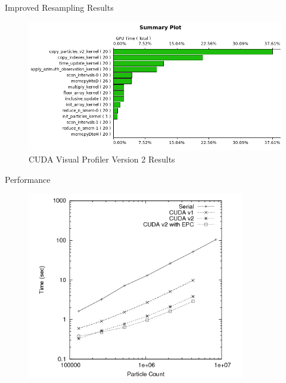 \documentclass{beamer}
\begin{document}

\begin{frame}{Improved Resampling Results}

\begin{figure}
\centering
\includegraphics[width=1.0\textwidth]{data/profile_cuda_version2_pic1.png}
\caption{CUDA Visual Profiler Version 2 Results}
\end{figure}

\end{frame}


\begin{frame}{Performance}

\begin{figure}
\centering
\includegraphics[width=0.85\textwidth]{data/timing_results.png}
\label{final_timing1}
\end{figure}

\end{frame}
\end{document}
